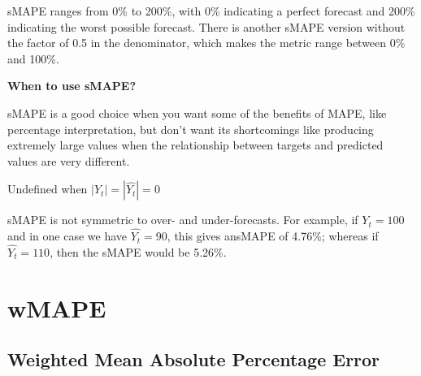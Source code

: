\begin{center}
\end{center}

sMAPE ranges from 0\% to 200\%, with 0\% indicating a perfect forecast and 200\% indicating the worst possible forecast. There is another sMAPE version without the factor of 0.5 in the denominator, which makes the metric range between 0\% and 100\%.

\textbf{When to use sMAPE?}

sMAPE is a good choice when you want some of the benefits of MAPE, like percentage interpretation, but don't want its shortcomings like producing extremely large values when the relationship between
targets and predicted values are very different.

{
    \item Undefined when $|Y_{t}| = |\hat{Y_{t}}| = 0$
    \item sMAPE is not symmetric to over- and under-forecasts. For example, if $Y_{t} = 100$ and in one case we have $\hat{Y_{t}} = 90$, this gives ansMAPE of 4.76\%; whereas if $\hat{Y_{t}} = 110$, then the sMAPE would be 5.26\%.
}


\clearpage
\thispagestyle{regressionstyle}
\section{wMAPE}
\subsection{Weighted Mean Absolute Percentage Error}

